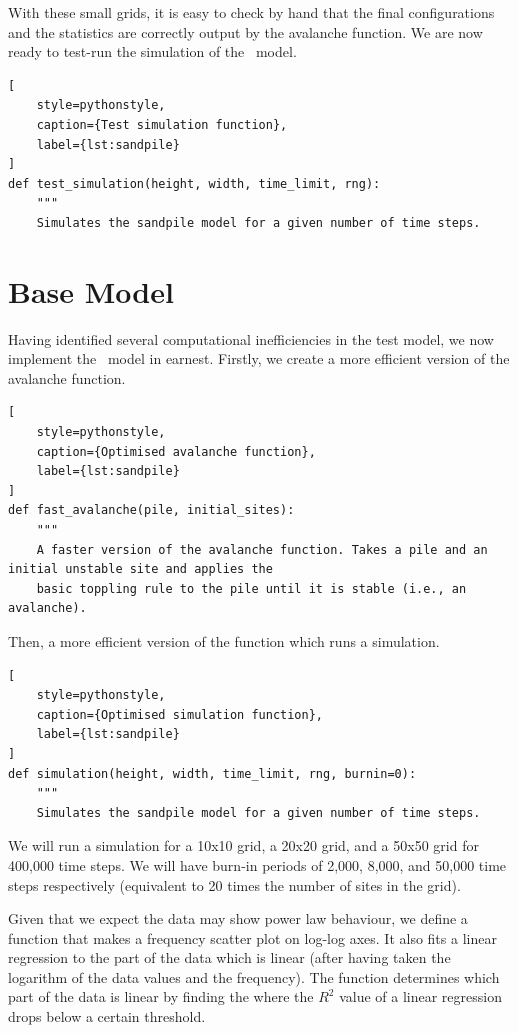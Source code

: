 With these small grids, it is easy to check by hand that the final configurations and the statistics are correctly output by the avalanche function. We are now ready to test-run the simulation of the \btw\ model.

\begin{lstlisting}[
    style=pythonstyle,
    caption={Test simulation function},
    label={lst:sandpile}
]
def test_simulation(height, width, time_limit, rng):
    """
    Simulates the sandpile model for a given number of time steps.
\end{lstlisting}





\section{Base Model}

Having identified several computational inefficiencies in the test model, we now implement the \btw\ model in earnest. Firstly, we create a more efficient version of the avalanche function.

\begin{lstlisting}[
    style=pythonstyle,
    caption={Optimised avalanche function},
    label={lst:sandpile}
]
def fast_avalanche(pile, initial_sites):
    """
    A faster version of the avalanche function. Takes a pile and an initial unstable site and applies the 
    basic toppling rule to the pile until it is stable (i.e., an avalanche).
\end{lstlisting}

Then, a more efficient version of the function which runs a simulation.

\begin{lstlisting}[
    style=pythonstyle,
    caption={Optimised simulation function},
    label={lst:sandpile}
]
def simulation(height, width, time_limit, rng, burnin=0):
    """
    Simulates the sandpile model for a given number of time steps.
\end{lstlisting}

We will run a simulation for a 10x10 grid, a 20x20 grid, and a 50x50 grid for 400,000 time steps. We will have burn-in periods of 2,000, 8,000, and 50,000 time steps respectively (equivalent to 20 times the number of sites in the grid).

Given that we expect the data may show power law behaviour, we define a function that makes a frequency scatter plot on log-log axes. It also fits a linear regression to the part of the data which is linear (after having taken the logarithm of the data values and the frequency). The function determines which part of the data is linear by finding the where the $R^2$ value of a linear regression drops below a certain threshold.

